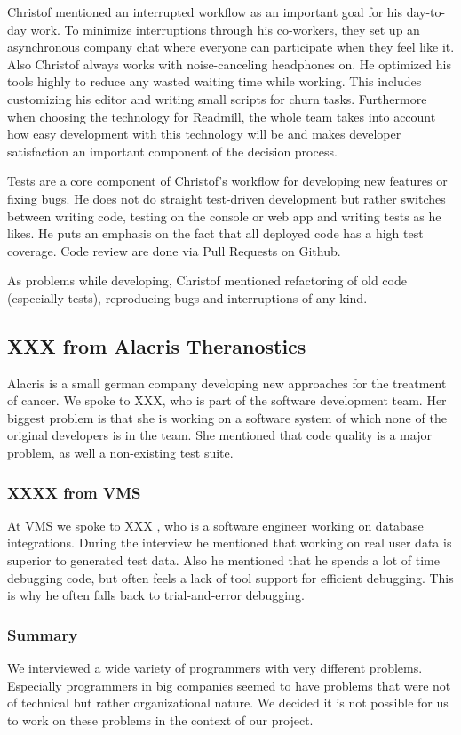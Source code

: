 Christof mentioned an interrupted workflow as an important goal for his day-to-day work. To minimize interruptions through his co-workers, they set up an asynchronous company chat where everyone can participate when they feel like it. Also Christof always works with noise-canceling headphones on. He optimized his tools highly to reduce any wasted waiting time while working. This includes customizing his editor and writing small scripts for churn tasks. Furthermore when choosing the technology for Readmill, the whole team takes into account how easy development with this technology will be and makes developer satisfaction an important component of the decision process.

Tests are a core component of Christof's workflow for developing new features or fixing bugs. He does not do straight test-driven development but rather switches between writing code, testing on the console or web app and writing tests as he likes. He puts an emphasis on the fact that all deployed code has a high test coverage. Code review are done via Pull Requests on Github.

As problems while developing, Christof mentioned refactoring of old code (especially tests), reproducing bugs and interruptions of any kind.

\subsection{XXX from Alacris Theranostics} Alacris is a small german company developing new approaches for the treatment of cancer. We spoke to XXX, who is part of the software development team. Her biggest problem is that she is working on a software system of which none of the original developers is in the team. She mentioned that code quality is a major problem, as well a non-existing test suite.

\subsubsection{XXXX from VMS} At VMS we spoke to XXX , who is a software engineer working on database integrations. During the interview he mentioned that working on real user data is superior to generated test data. Also he mentioned that he spends a lot of time debugging code, but often feels a lack of tool support for efficient debugging. This is why he often falls back to trial-and-error debugging.

\subsubsection{Summary} We interviewed a wide variety of programmers with very different problems. Especially programmers in big companies seemed to have problems that were not of technical but rather organizational nature. We decided it is not possible for us to work on these problems in the context of our project.

